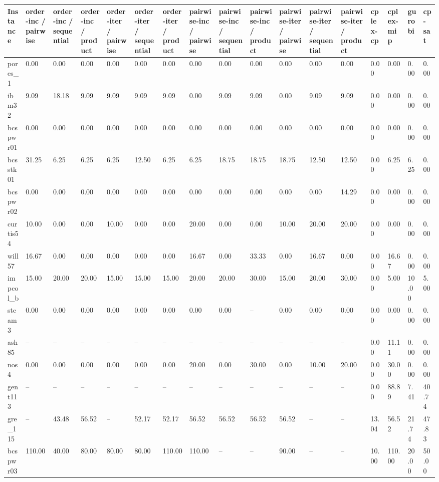 \begin{tabular}{lllllllllllllllll}
\hline
Instance & order-inc / pairwise & order-inc / sequential & order-inc / product & order-iter / pairwise & order-iter / sequential & order-iter / product & pairwise-inc / pairwise & pairwise-inc / sequential & pairwise-inc / product & pairwise-iter / pairwise & pairwise-iter / sequential & pairwise-iter / product & cplex-cp & cplex-mip & gurobi & cp-sat \\
\hline
pores\_1 & 0.00 & 0.00 & 0.00 & 0.00 & 0.00 & 0.00 & 0.00 & 0.00 & 0.00 & 0.00 & 0.00 & 0.00 & 0.00 & 0.00 & 0.00 & 0.00 \\
ibm32 & 9.09 & 18.18 & 9.09 & 9.09 & 9.09 & 9.09 & 0.00 & 9.09 & 9.09 & 0.00 & 9.09 & 9.09 & 0.00 & 0.00 & 0.00 & 0.00 \\
bcspwr01 & 0.00 & 0.00 & 0.00 & 0.00 & 0.00 & 0.00 & 0.00 & 0.00 & 0.00 & 0.00 & 0.00 & 0.00 & 0.00 & 0.00 & 0.00 & 0.00 \\
bcsstk01 & 31.25 & 6.25 & 6.25 & 6.25 & 12.50 & 6.25 & 6.25 & 18.75 & 18.75 & 18.75 & 12.50 & 12.50 & 0.00 & 6.25 & 6.25 & 0.00 \\
bcspwr02 & 0.00 & 0.00 & 0.00 & 0.00 & 0.00 & 0.00 & 0.00 & 0.00 & 0.00 & 0.00 & 0.00 & 14.29 & 0.00 & 0.00 & 0.00 & 0.00 \\
curtis54 & 10.00 & 0.00 & 0.00 & 10.00 & 0.00 & 0.00 & 20.00 & 0.00 & 0.00 & 10.00 & 20.00 & 20.00 & 0.00 & 0.00 & 0.00 & 0.00 \\
will57 & 16.67 & 0.00 & 0.00 & 0.00 & 0.00 & 0.00 & 16.67 & 0.00 & 33.33 & 0.00 & 16.67 & 0.00 & 0.00 & 16.67 & 0.00 & 0.00 \\
impcol\_b & 15.00 & 20.00 & 20.00 & 15.00 & 15.00 & 15.00 & 20.00 & 20.00 & 30.00 & 15.00 & 20.00 & 30.00 & 0.00 & 5.00 & 10.00 & 5.00 \\
steam3 & 0.00 & 0.00 & 0.00 & 0.00 & 0.00 & 0.00 & 0.00 & 0.00 & -- & 0.00 & 0.00 & 0.00 & 0.00 & 0.00 & 0.00 & 0.00 \\
ash85 & -- & -- & -- & -- & -- & -- & -- & -- & -- & -- & -- & -- & 0.00 & 11.11 & 0.00 & 0.00 \\
nos4 & 0.00 & 0.00 & 0.00 & 0.00 & 0.00 & 0.00 & 20.00 & 0.00 & 30.00 & 0.00 & 10.00 & 20.00 & 0.00 & 30.00 & 0.00 & 0.00 \\
gent113 & -- & -- & -- & -- & -- & -- & -- & -- & -- & -- & -- & -- & 0.00 & 88.89 & 7.41 & 40.74 \\
gre\_115 & -- & 43.48 & 56.52 & -- & 52.17 & 52.17 & 56.52 & 56.52 & 56.52 & 56.52 & -- & -- & 13.04 & 56.52 & 21.74 & 47.83 \\
bcspwr03 & 110.00 & 40.00 & 80.00 & 80.00 & 80.00 & 110.00 & 110.00 & -- & -- & 90.00 & -- & -- & 10.00 & 110.00 & 20.00 & 50.00 \\

\end{tabular}
